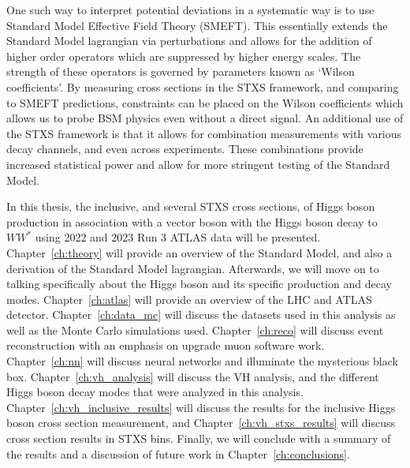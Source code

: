 One such way to interpret potential deviations in a systematic way is to use Standard Model Effective Field Theory (SMEFT). This essentially extends the Standard Model lagrangian via perturbations and allows for the addition of higher order operators which are suppressed by higher energy scales. The strength of these operators is governed by parameters known as `Wilson coefficients'. By measuring cross sections in the STXS framework, and comparing to SMEFT predictions, constraints can be placed on the Wilson coefficients which allows us to probe BSM physics even without a direct signal.
An additional use of the STXS framework is that it allows for combination measurements with various decay channels, and even across experiments. These combinations provide increased statistical power and allow for more stringent testing of the Standard Model.

In this thesis, the inclusive, and several STXS cross sections, of Higgs boson production in association with a vector boson with the Higgs boson decay to $WW^{*}$ using 2022 and 2023 Run 3 ATLAS data will be presented. Chapter~\ref{ch:theory} will provide an overview of the Standard Model, and also a derivation of the Standard Model lagrangian. Afterwards, we will move on to talking specifically about the Higgs boson and its specific production and decay modes. Chapter~\ref{ch:atlas} will provide an overview of the LHC and ATLAS detector. Chapter~\ref{ch:data_mc} will discuss the datasets used in this analysis as well as the Monte Carlo simulations used. Chapter~\ref{ch:reco} will discuss event reconstruction with an emphasis on upgrade muon software work. Chapter~\ref{ch:nn} will discuss neural networks and illuminate the mysterious black box. Chapter~\ref{ch:vh_analysis} will discuss the VH analysis, and the different Higgs boson decay modes that were analyzed in this analysis. Chapter~\ref{ch:vh_inclusive_results} will discuss the results for the inclusive Higgs boson cross section measurement, and Chapter~\ref{ch:vh_stxs_results} will discuss cross section results in STXS bins.
Finally, we will conclude with a summary of the results and a discussion of future work in Chapter~\ref{ch:conclusions}.


